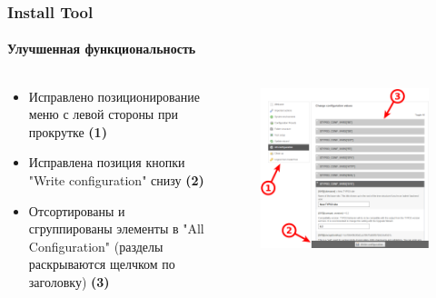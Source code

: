 
\begin{frame}[fragile]
	\frametitle{Install Tool}
	\framesubtitle{Улучшенная функциональность}

	\begin{columns}[T]
		\begin{column}{.5\textwidth}

			\begin{itemize}
				\item Исправлено позиционирование меню\newline
				с левой стороны при прокрутке
					\begingroup\color{typo3red}\textbf{(1)}\endgroup
				\item Исправлена позиция кнопки "Write configuration" снизу
					\begingroup\color{typo3red}\textbf{(2)}\endgroup
				\item Отсортированы и сгруппированы элементы в "All Configuration" (разделы раскрываются щелчком по заголовку)
					\begingroup\color{typo3red}\textbf{(3)}\endgroup
			\end{itemize}

		\end{column}
		\begin{column}{.5\textwidth}

			\begin{figure}\vspace*{-0.4cm}
				\includegraphics[width=0.8\linewidth]{Images/InstallTool/ImprovedUsability.png}
			\end{figure}

		\end{column}
	\end{columns}

\end{frame}

